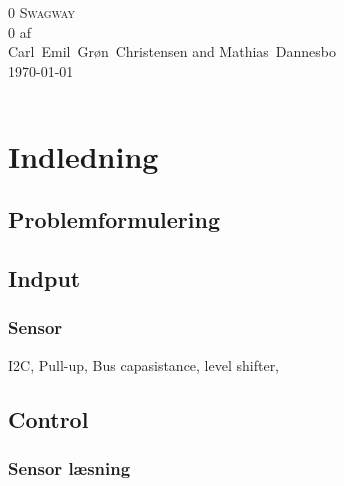 \documentclass[a4paper,oneside,article,danish,table,draft]{memoir}
\newcommand{\authorvar}{Carl~Emil~Grøn~Christensen and Mathias~Dannesbo}
\newcommand{\pretitlevar}{0}
\newcommand{\titlevar}{Swagway}
\newcommand{\subtitlevar}{0}
\newcommand{\datevar}{\today}
\begin{document}

\begin{center}
  \if\pretitlevar 0
  \else{\Large\pretitlevar\\} \fi
  \textsc{\HUGE\titlevar\\}
  \if\subtitlevar 0
  \else {\Large\subtitlevar\\} \fi
  {\LARGE 
  af\\
   \authorvar}\\
 \datevar\\
\end{center}

\vfill
\begin{abstract} %
\end{abstract}\vfill
\noindent
\begin{tabular*}{\textwidth}{@{\extracolsep{\fill}} ll}

\end{tabular*}

\thispagestyle{empty}
\clearpage
\setcounter{tocdepth}{2} \tableofcontents \clearpage


\chapter{Indledning}\label{chap:ind}
\section{Problemformulering}

\section{Indput}

\subsection{Sensor}
I2C, Pull-up, Bus capasistance, level shifter,

\section{Control}

\subsection{Sensor læsning}
\end{document}
